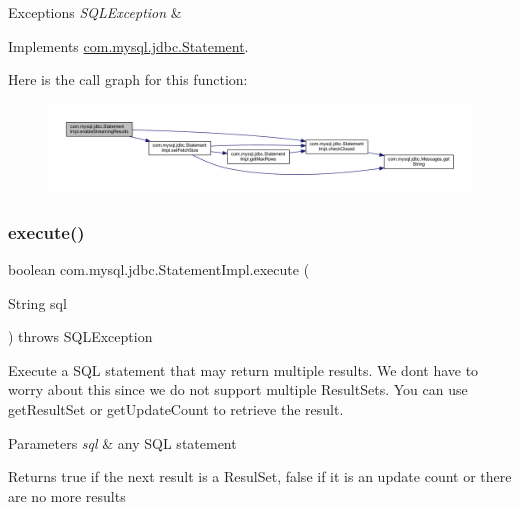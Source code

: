 \begin{DoxyExceptions}{Exceptions}
{\em S\+Q\+L\+Exception} & \\
\hline
\end{DoxyExceptions}


Implements \mbox{\hyperlink{interfacecom_1_1mysql_1_1jdbc_1_1_statement_aa90a0a4175d666982052d7bccacc272e}{com.\+mysql.\+jdbc.\+Statement}}.

Here is the call graph for this function\+:
\nopagebreak
\begin{figure}[H]
\begin{center}
\leavevmode
\includegraphics[width=350pt]{classcom_1_1mysql_1_1jdbc_1_1_statement_impl_aebd63b45b20e164efe403d4c1d5bebc9_cgraph}
\end{center}
\end{figure}
\mbox{\label{classcom_1_1mysql_1_1jdbc_1_1_statement_impl_a256ef5c122e8a99cb18d436bff0b398e}} 
\subsubsection{\texorpdfstring{execute()}{execute()}\hspace{0.1cm}{\footnotesize\ttfamily [1/4]}}
{\footnotesize\ttfamily boolean com.\+mysql.\+jdbc.\+Statement\+Impl.\+execute (\begin{DoxyParamCaption}\item[{String}]{sql }\end{DoxyParamCaption}) throws S\+Q\+L\+Exception}

Execute a S\+QL statement that may return multiple results. We don\textquotesingle{}t have to worry about this since we do not support multiple Result\+Sets. You can use get\+Result\+Set or get\+Update\+Count to retrieve the result.


\begin{DoxyParams}{Parameters}
{\em sql} & any S\+QL statement\\
\hline
\end{DoxyParams}
\begin{DoxyReturn}{Returns}
true if the next result is a Resul\+Set, false if it is an update count or there are no more results
\end{DoxyReturn}

